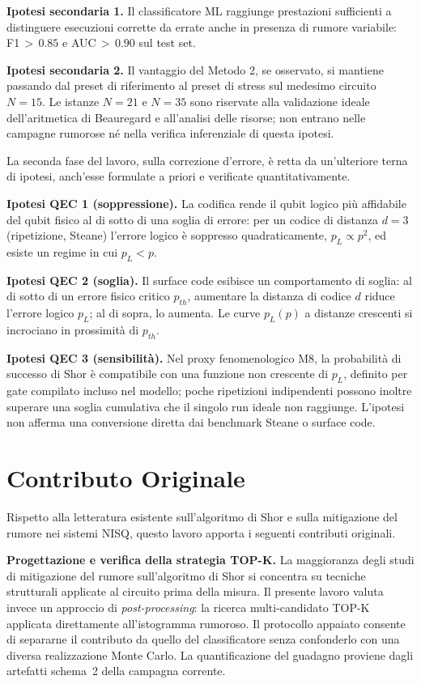 \begin{onehalfspace}
\textbf{Ipotesi secondaria 1.} Il classificatore ML raggiunge prestazioni sufficienti a distinguere esecuzioni corrette da errate anche in presenza di rumore variabile: F1\,$>\,0.85$ e AUC\,$>\,0.90$ sul test set.

\textbf{Ipotesi secondaria 2.} Il vantaggio del Metodo 2, se osservato, si mantiene passando dal preset di riferimento al preset di stress sul medesimo circuito $N=15$. Le istanze $N=21$ e $N=35$ sono riservate alla validazione ideale dell'aritmetica di Beauregard e all'analisi delle risorse; non entrano nelle campagne rumorose né nella verifica inferenziale di questa ipotesi.

\medskip
La seconda fase del lavoro, sulla correzione d'errore, è retta da un'ulteriore terna di ipotesi, anch'esse formulate a priori e verificate quantitativamente.

\textbf{Ipotesi QEC 1 (soppressione).} La codifica rende il qubit logico più affidabile del qubit fisico al di sotto di una soglia di errore: per un codice di distanza $d=3$ (ripetizione, Steane) l'errore logico è soppresso quadraticamente, $p_L \propto p^2$, ed esiste un regime in cui $p_L < p$.

\textbf{Ipotesi QEC 2 (soglia).} Il surface code esibisce un comportamento di soglia: al di sotto di un errore fisico critico $p_{th}$, aumentare la distanza di codice $d$ riduce l'errore logico $p_L$; al di sopra, lo aumenta. Le curve $p_L(p)$ a distanze crescenti si incrociano in prossimità di $p_{th}$.

\textbf{Ipotesi QEC 3 (sensibilità).} Nel proxy fenomenologico M8, la probabilità di successo di Shor è compatibile con una funzione non crescente di $p_L$, definito per gate compilato incluso nel modello; poche ripetizioni indipendenti possono inoltre superare una soglia cumulativa che il singolo run ideale non raggiunge. L'ipotesi non afferma una conversione diretta dai benchmark Steane o surface code.

\section{Contributo Originale}
\label{sec:contributo_originale}

Rispetto alla letteratura esistente sull'algoritmo di Shor e sulla mitigazione del rumore nei sistemi NISQ, questo lavoro apporta i seguenti contributi originali.

\textbf{Progettazione e verifica della strategia TOP-K.} La maggioranza degli studi di mitigazione del rumore sull'algoritmo di Shor si concentra su tecniche strutturali applicate al circuito prima della misura. Il presente lavoro valuta invece un approccio di \textit{post-processing}: la ricerca multi-candidato TOP-K applicata direttamente all'istogramma rumoroso. Il protocollo appaiato consente di separarne il contributo da quello del classificatore senza confonderlo con una diversa realizzazione Monte Carlo. La quantificazione del guadagno proviene dagli artefatti schema~2 della campagna corrente.


\end{onehalfspace}
